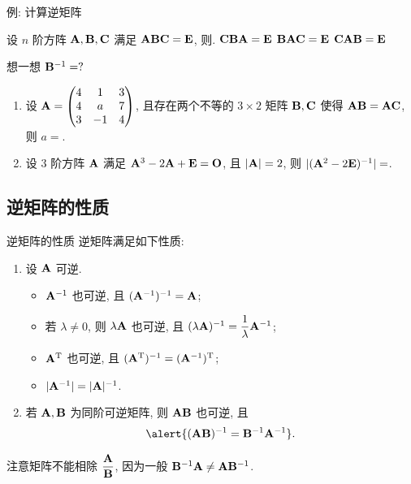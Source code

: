 \begin{frame}{例: 计算逆矩阵}
	\onslide<+->
	\begin{example}
		设 $n$ 阶方阵 ${\mathbf{A}},{\mathbf{B}},{\mathbf{C}}$ 满足 ${\mathbf{A}}{\mathbf{B}}{\mathbf{C}}={\mathbf{E}}$, 则.
		\xx{$\bfA\bfC\bfB=\bfE$}%
		{${\mathbf{C}}{\mathbf{B}}{\mathbf{A}}={\mathbf{E}}$}%
		{${\mathbf{B}}{\mathbf{A}}{\mathbf{C}}={\mathbf{E}}$}%
		{${\mathbf{C}}{\mathbf{A}}{\mathbf{B}}={\mathbf{E}}$}
	\end{example}
	\onslide<+->
	想一想 ${\mathbf{B}}^{-1}=?$
	\onslide<+->
	\begin{exercise}
		\begin{enumerate}
			\item 设 ${\mathbf{A}}=\begin{pmatrix}
				4&1&3\\4&a&7\\3&-1&4
			\end{pmatrix}$, 且存在两个不等的 $3\times2$ 矩阵 ${\mathbf{B}},{\mathbf{C}}$ 使得 ${\mathbf{A}}{\mathbf{B}}={\mathbf{A}}{\mathbf{C}}$, 则 $a=$.
			\item 设 $3$ 阶方阵 ${\mathbf{A}}$ 满足 ${\mathbf{A}}^3-2{\mathbf{A}}+{\mathbf{E}}={\mathbf{O}}$, 且 $|{\mathbf{A}}|=2$, 则 $|({\mathbf{A}}^2-2{\mathbf{E}})^{-1}|=$.
		\end{enumerate}
	\end{exercise}
\end{frame}


\subsection{逆矩阵的性质}

\begin{frame}{逆矩阵的性质}
	\onslide<+->
	逆矩阵满足如下性质:
	\begin{enumerate}
		\item 设 ${\mathbf{A}}$ 可逆.
		\begin{itemize}
			\item ${\mathbf{A}}^{-1}$ 也可逆, 且 $({\mathbf{A}}^{-1})^{-1}={\mathbf{A}}$;
			\item 若 $\lambda\neq 0$, 则 $\lambda{\mathbf{A}}$ 也可逆, 且 $(\lambda{\mathbf{A}})^{-1}=\dfrac1\lambda{\mathbf{A}}^{-1}$;
			\item ${\mathbf{A}}^{\mathrm{T}}$ 也可逆, 且 $({\mathbf{A}}^{\mathrm{T}})^{-1}=({\mathbf{A}}^{-1})^{\mathrm{T}}$;
			\item $|{\mathbf{A}}^{-1}|=|{\mathbf{A}}|^{-1}$.
		\end{itemize}
		\item 若 ${\mathbf{A}},{\mathbf{B}}$ 为同阶可逆矩阵, 则 ${\mathbf{A}}{\mathbf{B}}$ 也可逆, 且
		\[\alert{(\bfA\bfB)^{-1}=\bfB^{-1}\bfA^{-1}}.\]
		\onslide<+->{%
			一般地
			\[\alert{(\bfA_1\bfA_2\cdots\bfA_n)^{-1}=\bfA_n^{-1}\cdots\bfA_2^{-1}\bfA_1^{-1}}.\]
		}
	\end{enumerate}
	\onslide<+->
	注意矩阵不能相除 $\dfrac{{\mathbf{A}}}{{\mathbf{B}}}$, 因为一般 ${\mathbf{B}}^{-1}{\mathbf{A}}\neq{\mathbf{A}}{\mathbf{B}}^{-1}$.
\end{frame}


